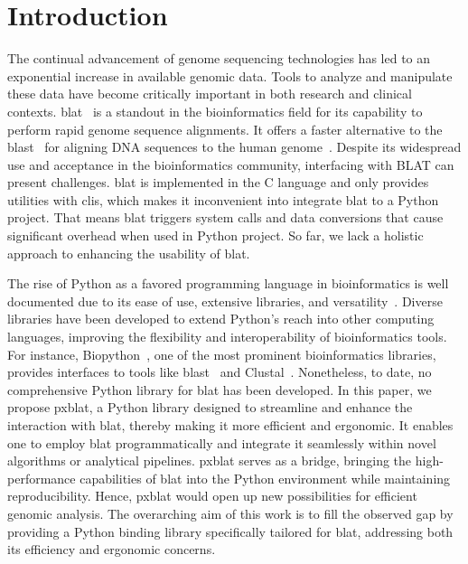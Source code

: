 \documentclass[unnumsec,webpdf,contemporary,large]{oup-authoring-template}%
\theoremstyle{thmstyleone}%
\theoremstyle{thmstyletwo}%
\theoremstyle{thmstylethree}%
\begin{document}
\maketitle


\section{Introduction}

The continual advancement of genome sequencing technologies has led to an exponential increase in available genomic data.
Tools to analyze and manipulate these data have become critically important in both research and clinical contexts.
\gls{blat}~\citep{kent2002blat} is a standout in the bioinformatics field for its capability to perform rapid genome sequence alignments.
It offers a faster alternative to the \gls{blast}~\citep{altschul1990basic} for aligning DNA sequences to the human genome~\citep{kent2002blat}.
Despite its widespread use and acceptance in the bioinformatics community, interfacing with BLAT can present challenges.
\gls{blat} is implemented in the C language and only provides utilities with \glspl{cli}, which makes it inconvenient into integrate \gls{blat} to a Python project.
That means \gls{blat} triggers system calls and data conversions that cause significant overhead when used in Python project.
So far, we lack a holistic approach to enhancing the usability of \gls{blat}.

The rise of Python as a favored programming language in bioinformatics is well documented due to its ease of use, extensive libraries, and versatility~\cite{perkel2015programming}.
Diverse libraries have been developed to extend Python's reach into other computing languages, improving the flexibility and interoperability of bioinformatics tools.
For instance, Biopython~\citep{cock2009biopython}, one of the most prominent bioinformatics libraries, provides interfaces to tools like \gls{blast}~\citep{altschul1990basic} and Clustal~\citep{higgins1988clustal}.
Nonetheless, to date, no comprehensive Python library for \gls{blat} has been developed.
In this paper, we propose \gls{pxblat}, a Python library designed to streamline and enhance the interaction with \gls{blat}, thereby making it more efficient and ergonomic.
It enables one to employ \gls{blat} programmatically and integrate it  seamlessly within novel algorithms or analytical pipelines.
\gls{pxblat} serves as a bridge, bringing the high-performance capabilities of \gls{blat} into the Python environment while maintaining reproducibility.
Hence, \gls{pxblat} would open up new possibilities for efficient genomic analysis.
The overarching aim of this work is to fill the observed gap by providing a Python binding library specifically tailored for \gls{blat}, addressing both its efficiency and ergonomic concerns.
\end{document}
